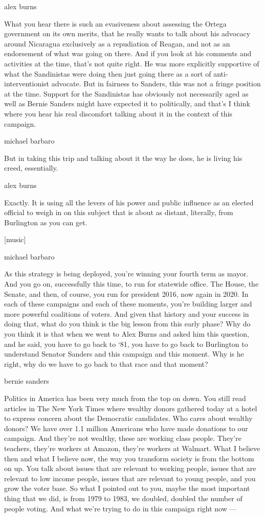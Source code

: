 alex burns

What you hear there is such an evasiveness about assessing the Ortega
government on its own merits, that he really wants to talk about his
advocacy around Nicaragua exclusively as a repudiation of Reagan, and
not as an endorsement of what was going on there. And if you look at his
comments and activities at the time, that's not quite right. He was more
explicitly supportive of what the Sandinistas were doing then just going
there as a sort of anti-interventionist advocate. But in fairness to
Sanders, this was not a fringe position at the time. Support for the
Sandinistas has obviously not necessarily aged as well as Bernie Sanders
might have expected it to politically, and that's I think where you hear
his real discomfort talking about it in the context of this campaign.

michael barbaro

But in taking this trip and talking about it the way he does, he is
living his creed, essentially.

alex burns

Exactly. It is using all the levers of his power and public influence as
an elected official to weigh in on this subject that is about as
distant, literally, from Burlington as you can get.

{[}music{]}

michael barbaro

As this strategy is being deployed, you're winning your fourth term as
mayor. And you go on, successfully this time, to run for statewide
office. The House, the Senate, and then, of course, you run for
president 2016, now again in 2020. In each of these campaigns and each
of these moments, you're building larger and more powerful coalitions of
voters. And given that history and your success in doing that, what do
you think is the big lesson from this early phase? Why do you think it
is that when we went to Alex Burns and asked him this question, and he
said, you have to go back to `81, you have to go back to Burlington to
understand Senator Sanders and this campaign and this moment. Why is he
right, why do we have to go back to that race and that moment?

bernie sanders

Politics in America has been very much from the top on down. You still
read articles in The New York Times where wealthy donors gathered today
at a hotel to express concern about the Democratic candidates. Who cares
about wealthy donors? We have over 1.1 million Americans who have made
donations to our campaign. And they're not wealthy, these are working
class people. They're teachers, they're workers at Amazon, they're
workers at Walmart. What I believe then and what I believe now, the way
you transform society is from the bottom on up. You talk about issues
that are relevant to working people, issues that are relevant to low
income people, issues that are relevant to young people, and you grow
the voter base. So what I pointed out to you, maybe the most important
thing that we did, is from 1979 to 1983, we doubled, doubled the number
of people voting. And what we're trying to do in this campaign right now
---

